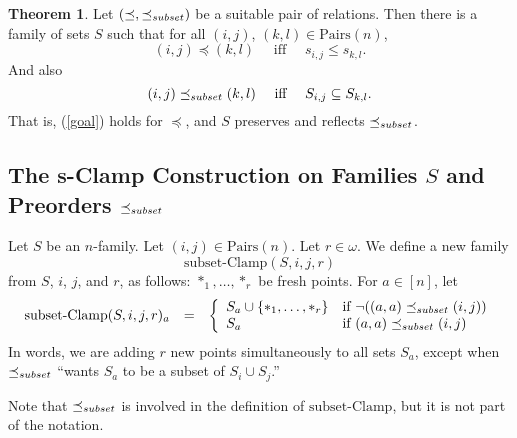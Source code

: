 \documentclass[12pt]{article}
\theoremstyle{definition}
\newtheorem{theorem}{Theorem}
\newcommand{\set}[1]{\{ #1 \}}
\newcommand{\quadiff}{\quad \mbox{ iff } \quad}
\newcommand{\nott}{\neg}
\newcommand{\Pairs}{\mbox{Pairs}}
\newcommand{\sClamp}{\mbox{subset-Clamp}}
\newcommand{\precsubseteq}{\preceq_{\scriptsize subset}}
\begin{document}
\begin{theorem}
Let $(\preceq, \precsubseteq)$ be a suitable pair of relations.
Then there is a family of sets $S$
such that for all $(i,j)$, $(k,l)\in\Pairs(n)$,
\begin{equation}
    \label{goal-main1}
 (i,j) \preceq  (k,l) \quadiff 
 s_{i,j}\leq s_{k,l}.
 \end{equation}
 And also
 \begin{equation}
    \label{goal-main2}
 (i,j) \precsubseteq  (k,l) \quadiff 
S_{i,j}\subseteq S_{k,l}.
 \end{equation}
 That is, (\ref{goal}) holds for $\preceq$, and $S$ preserves and reflects $\precsubseteq$.
 \label{theorem-thoughts-subset}
 \end{theorem}
 
 
\subsection{The s-Clamp Construction on Families  $S$  and Preorders
$\precsubseteq$}
 Let $S$ be an $n$-family.
 Let $(i,j)\in\Pairs(n)$.
 Let $r\in \omega$.
 We define a new family 
 \[ \sClamp(S,i,j,r)\]
 from $S$, $i$, $j$, and $r$, as follows:
$*_1,\ldots, *_r$ be   fresh points.
For $a\in[n]$, let 
\[ \begin{array}{lcl}
\sClamp(S,i,j,r)_a & = & \left\{
\begin{array}{ll}
S_a \cup \set{*_1,\ldots, *_r} & \mbox{if $\nott ((a,a)\precsubseteq (i,j))$}\\
 S_a & \mbox{if $(a,a)\precsubseteq (i,j)$}\\ 
 \end{array}
 \right.
\end{array}
\]
In words, we are adding $r$ new points
simultaneously to all sets $S_a$, except when 
$\precsubseteq$ ``wants 
$S_a$ to be a subset of  $S_i\cup S_j$.''

Note that $\precsubseteq$ is involved in the definition of $\sClamp$, but it is not
part of the notation.
\end{document}
